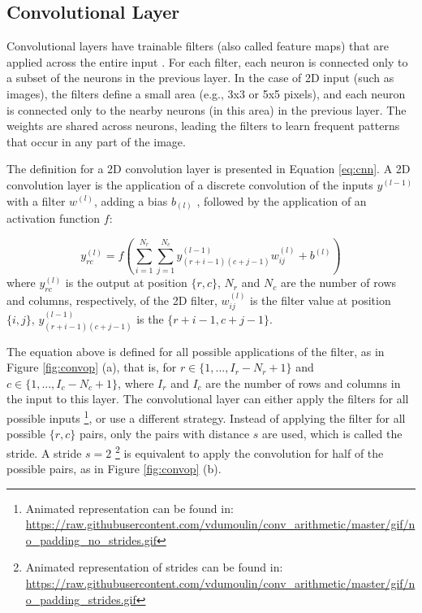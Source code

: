 \subsection{Convolutional Layer}
Convolutional layers have trainable filters (also called feature maps) that are applied
across the entire input \cite{lecun1995convolutional}. For each filter, each neuron is connected only to a subset of
the neurons in the previous layer. In the case of 2D input (such as images), the filters
define a small area (e.g., 3x3 or 5x5 pixels), and each neuron is connected only to the
nearby neurons (in this area) in the previous layer. The weights are shared across neurons,
leading the filters to learn frequent patterns that occur in any part of the image.

The definition for a 2D convolution layer is presented in Equation \ref{eq:cnn}. A 2D convolution layer is the application of a discrete convolution of the inputs $y^{(l-1)}$ with a filter $w^{(l)}$, adding a bias $b_{(l)}$ , followed by the application of an activation function $f$:

\begin{equation}
y^{(l)}_{rc} = f(\sum_{i=1}^{N_{r}} \sum_{j=1}^{N_{c}} y^{(l-1)}_{(r+i-1)(c+j-1)} w^{(l)}_{ij} + b^{(l)} )
\label{eq:cnn}
\end{equation}
where $y^{(l)}_{rc}$ is the output at position $\{r,c\}$, $N_{r}$ and $N_{c}$ are the number of rows and columns, respectively, of the 2D filter, $w^{(l)}_{ij}$ is the filter value at position $\{i,j\}$, $y^{(l-1)}_{(r+i-1)(c+j-1)}$ is the $\{r+i-1,c+j-1\}$.


The equation above is defined for all possible applications of the filter, as in Figure \ref{fig:convop} (a), that is, for
$r \in \{1, ..., I_{r} - N_{r} + 1\}$ and $c \in \{1, ..., I_{c} - N_{c} + 1\}$, where $I_{r}$ and $I_{c}$ are the number of rows and columns in the input to this layer. The convolutional layer can either apply the filters for all possible inputs \footnote{Animated representation can be found in: \url{https://raw.githubusercontent.com/vdumoulin/conv_arithmetic/master/gif/no_padding_no_strides.gif}}, or use a different strategy. Instead of applying the filter for all possible $\{r, c\}$ pairs, only the pairs with distance
$s$ are used, which is called the stride. A stride $s = 2$ \footnote{Animated representation of strides can be found in: \url{https://raw.githubusercontent.com/vdumoulin/conv_arithmetic/master/gif/no_padding_strides.gif}} is equivalent to apply the convolution for half of the possible pairs, as in Figure \ref{fig:convop} (b).

